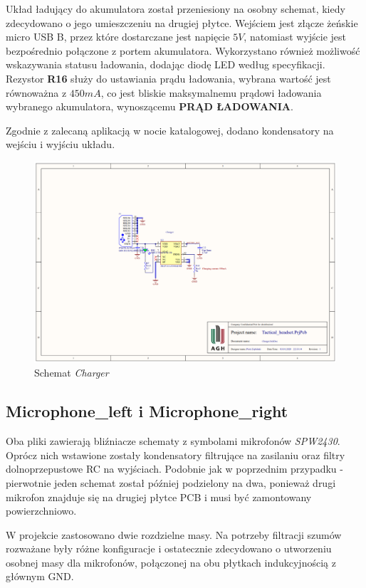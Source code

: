 Układ ładujący do akumulatora został przeniesiony na osobny schemat, kiedy zdecydowano o jego umieszczeniu na drugiej płytce. Wejściem jest złącze żeńskie micro USB B, przez które dostarczane jest napięcie $5V$, natomiast wyjście jest bezpośrednio połączone z portem akumulatora. Wykorzystano również możliwość wskazywania statusu ładowania, dodając diodę LED według specyfikacji. Rezystor \textbf{R16} służy do ustawiania prądu ładowania, wybrana wartość jest równoważna z $450mA$, co jest bliskie maksymalnemu prądowi ładowania wybranego akumulatora, wynoszącemu \textbf{PRĄD ŁADOWANIA}. 

Zgodnie z zalecaną aplikacją w nocie katalogowej, dodano kondensatory na wejściu i wyjściu układu.

\begin{figure}[H]
	\centering
	\includegraphics[scale=0.4]{zdjecia/PCB/charger.png}
	\caption{\label{charger} Schemat \textit{Charger}}
\end{figure}


\subsection{Microphone\_left i Microphone\_right}

Oba pliki zawierają bliźniacze schematy z symbolami mikrofonów \textit{SPW2430}. Oprócz nich wstawione zostały kondensatory filtrujące na zasilaniu oraz filtry dolnoprzepustowe RC na wyjściach. Podobnie jak w poprzednim przypadku - pierwotnie jeden schemat został później podzielony na dwa, ponieważ drugi mikrofon znajduje się na drugiej płytce PCB i musi być zamontowany powierzchniowo.

W projekcie zastosowano dwie rozdzielne masy. Na potrzeby filtracji szumów rozważane były różne konfiguracje i ostatecznie zdecydowano o utworzeniu osobnej masy dla mikrofonów, połączonej na obu płytkach indukcyjnością z głównym GND.

